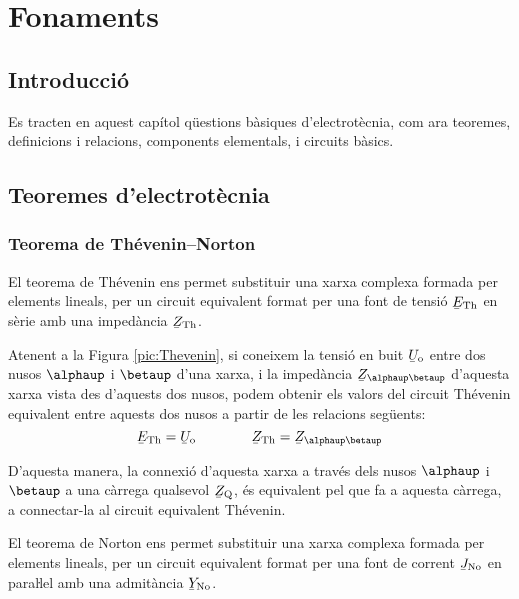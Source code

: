 \chapter{Fonaments}

\section{Introducció}
Es tracten en aquest capítol qüestions bàsiques
d'electrotècnia, com ara teoremes, definicions i relacions, components elementals, i circuits bàsics.


\section{Teoremes d'electrotècnia}\label{sec:teoremes}

\subsection{\texorpdfstring{Teorema de Thévenin--Norton}{Teorema de
            Thévenin-Norton}}\label{sec:T_N}

El teorema de Thévenin ens permet
substituir una xarxa complexa formada per elements lineals, per un
circuit equivalent format per una font de tensió $\cmplx{E}\ped{Th}$
en sèrie amb una impedància $\cmplx{Z}\ped{Th}$.


Atenent a la Figura \vref{pic:Thevenin}, si coneixem la tensió en
buit $\cmplx{U}\ped{o}$ entre dos nusos $\alphaup$ i $\betaup$ d'una
xarxa, i la impedància $\cmplx{Z}_{\alphaup\betaup}$ d'aquesta xarxa
vista des d'aquests dos nusos, podem obtenir els valors del circuit
Thévenin equivalent entre aquests dos nusos a partir de les
relacions següents:
\begin{equation}
   \cmplx{E}\ped{Th} = \cmplx{U}\ped{o} \qquad\qquad  \cmplx{Z}\ped{Th} = \cmplx{Z}_{\alphaup\betaup}
\end{equation}

D'aquesta manera, la connexió d'aquesta xarxa a través dels nusos
$\alphaup$ i $\betaup$ a una càrrega qualsevol $\cmplx{Z}\ped{Q}$, és
equivalent pel que fa a aquesta càrrega, a connectar-la al circuit
equivalent Thévenin.
\begin{center}
    
    \label{pic:Thevenin}
\end{center}

El teorema de Norton ens permet substituir
una xarxa complexa formada per elements lineals, per un circuit
equivalent format per una font de corrent $\cmplx{J}\ped{No}$ en
paraŀlel amb una admitància $\cmplx{Y}\ped{No}$.

